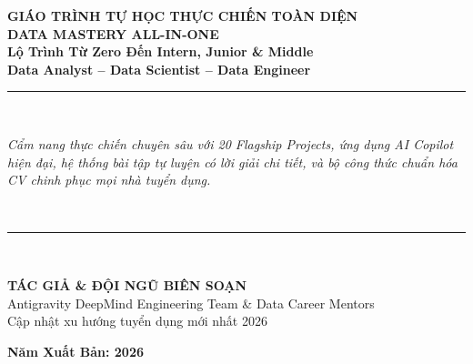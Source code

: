\documentclass[11pt,a4paper,oneside]{book}
\begin{document}
\begin{titlepage}
\begin{center}
\vspace*{1.5cm}
{\huge\bfseries\color{navyprimary} GIÁO TRÌNH TỰ HỌC THỰC CHIẾN TOÀN DIỆN}\\[0.6cm]
{\Huge\bfseries\color{violetaccent} DATA MASTERY ALL-IN-ONE}\\[0.5cm]
{\Large\color{tealsecondary}\textbf{Lộ Trình Từ Zero Đến Intern, Junior \& Middle}}\\[0.3cm]
{\large\textbf{Data Analyst -- Data Scientist -- Data Engineer}}\\[1.5cm]

\rule{\linewidth}{1.5pt}\\[0.6cm]
\parbox{0.9\linewidth}{\centering\itshape\large
Cẩm nang thực chiến chuyên sâu với 20 Flagship Projects, ứng dụng AI Copilot hiện đại, hệ thống bài tập tự luyện có lời giải chi tiết, và bộ công thức chuẩn hóa CV chinh phục mọi nhà tuyển dụng.
}\\[0.6cm]
\rule{\linewidth}{1.5pt}\\[2.5cm]

\begin{tcolorbox}[enhanced,colback=navyprimary,colframe=navyprimary,arc=5mm,width=0.85\linewidth,center,halign=center]
\vspace{0.3cm}
{\color{white}\textbf{\Large TÁC GIẢ \& ĐỘI NGŨ BIÊN SOẠN}}\\[0.2cm]
{\color{white}\normalsize Antigravity DeepMind Engineering Team \& Data Career Mentors}\\[0.1cm]
{\color{white}\small Cập nhật xu hướng tuyển dụng mới nhất 2026}
\vspace{0.3cm}
\end{tcolorbox}

\vfill
{\large\textbf{Năm Xuất Bản: 2026}}
\end{center}
\end{titlepage}

\tableofcontents
\newpage



























\end{document}
